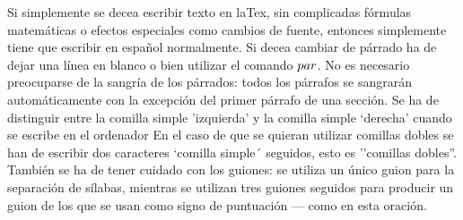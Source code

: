 \documentclass[a4paper,10pt]{letter}
\begin{document}
Si simplemente se decea escribir texto en laTex,
sin complicadas fórmulas matemáticas o efectos especiales
como cambios de fuente, entonces simplemente tiene que escribir
en español normalmente.
Si decea cambiar de párrado ha de dejar una línea en blanco o bien
utilizar el comando $\\par$.
No es necesario preocuparse de la sangría de los párrados:
todos los párrafos se sangrarán automáticamente con la excepción
del primer párrafo de una sección.
Se ha de distinguir entre la comilla simple 'izquierda'
y la comilla simple `derecha' cuando se escribe en el ordenador
En el caso de que se quieran utilizar comillas dobles se han de
escribir dos caracteres `comilla simple´ seguidos, esto es
''comillas dobles''.
También se ha de tener cuidado con los guiones: se utiliza un único
guion para la separación de sílabas, mientras se utilizan
tres guiones seguidos para producir un guion de los que se usan 
como signo de puntuación --- como en esta oración. 
\end{document}
